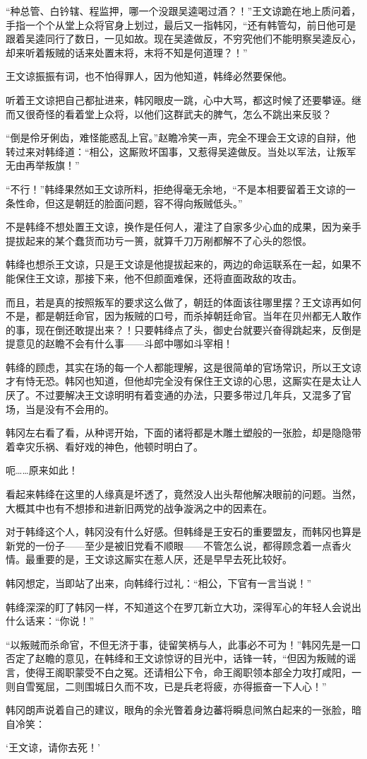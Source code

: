 “种总管、白钤辖、程监押，哪一个没跟吴逵喝过酒？！”王文谅跪在地上质问着，手指一个个从堂上众将官身上划过，最后又一指韩冈，“还有韩管勾，前日他可是跟着吴逵同行了数日，一见如故。现在吴逵做反，不穷究他们不能明察吴逵反心，却来听着叛贼的话来处置末将，末将不知是何道理？！”

王文谅振振有词，也不怕得罪人，因为他知道，韩绛必然要保他。

听着王文谅把自己都扯进来，韩冈眼皮一跳，心中大骂，都这时候了还要攀诬。继而又很奇怪的看着堂上众将，以他们这群武夫的脾气，怎么不跳出来反驳？

“倒是伶牙俐齿，难怪能惑乱上官。”赵瞻冷笑一声，完全不理会王文谅的自辩，他转过来对韩绛道：“相公，这厮败坏国事，又惹得吴逵做反。当处以军法，让叛军无由再举叛旗！”

“不行！”韩绛果然如王文谅所料，拒绝得毫无余地，“不是本相要留着王文谅的一条性命，但这是朝廷的脸面问题，容不得向叛贼低头。”

不是韩绛不想处置王文谅，换作是任何人，灌注了自家多少心血的成果，因为亲手提拔起来的某个蠢货而功亏一篑，就算千刀万剐都解不了心头的怨恨。

韩绛也想杀王文谅，只是王文谅是他提拔起来的，两边的命运联系在一起，如果不能保住王文谅，那接下来，他不但颜面难保，还将直面政敌的攻击。

而且，若是真的按照叛军的要求这么做了，朝廷的体面该往哪里摆？王文谅再如何不是，都是朝廷命官，因为叛贼的口号，而杀掉朝廷命官。当年在贝州都无人敢作的事，现在倒还敢提出来？！只要韩绛点了头，御史台就要兴奋得跳起来，反倒是提意见的赵瞻不会有什么事——斗郎中哪如斗宰相！

韩绛的顾虑，其实在场的每一个人都能理解，这是很简单的官场常识，所以王文谅才有恃无恐。韩冈也知道，但他却完全没有保住王文谅的心思，这厮实在是太让人厌了。不过要解决王文谅明明有着变通的办法，只要多带过几年兵，又混多了官场，当是没有不会用的。

韩冈左右看了看，从种谔开始，下面的诸将都是木雕土塑般的一张脸，却是隐隐带着幸灾乐祸、看好戏的神色，他顿时明白了。

呃……原来如此！

看起来韩绛在这里的人缘真是坏透了，竟然没人出头帮他解决眼前的问题。当然，大概其中也有不想掺和进新旧两党的战争漩涡之中的因素在。

对于韩绛这个人，韩冈没有什么好感。但韩绛是王安石的重要盟友，而韩冈也算是新党的一份子——至少是被旧党看不顺眼——不管怎么说，都得顾念着一点香火情。最重要的是，王文谅这厮实在惹人厌，还是早早去死比较好。

韩冈想定，当即站了出来，向韩绛行过礼：“相公，下官有一言当说！”

韩绛深深的盯了韩冈一样，不知道这个在罗兀新立大功，深得军心的年轻人会说出什么话来：“你说！”

“以叛贼而杀命官，不但无济于事，徒留笑柄与人，此事必不可为！”韩冈先是一口否定了赵瞻的意见，在韩绛和王文谅惊讶的目光中，话锋一转，“但因为叛贼的谣言，使得王阁职蒙受不白之冤。还请相公下令，命王阁职领本部全力攻打咸阳，一则自雪冤屈，二则围城日久而不攻，已是兵老将疲，亦得振奋一下人心！”

韩冈朗声说着自己的建议，眼角的余光瞥着身边蕃将瞬息间煞白起来的一张脸，暗自冷笑：

‘王文谅，请你去死！’

